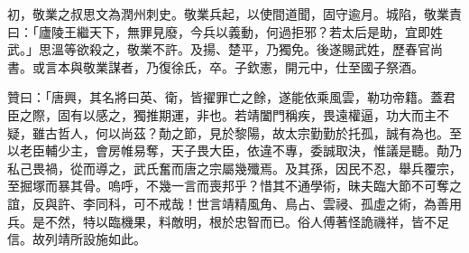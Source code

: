 \begin{pinyinscope}
 初，敬業之叔思文為潤州刺史。敬業兵起，以使間道聞，固守逾月。城陷，敬業責曰：「廬陵王繼天下，無罪見廢，今兵以義動，何過拒邪？若太后是助，宜即姓武。」思溫等欲殺之，敬業不許。及揚、楚平，乃獨免。後遂賜武姓，歷春官尚書。或言本與敬業謀者，乃復徐氏，卒。子欽憲，開元中，仕至國子祭酒。



 贊曰：「唐興，其名將曰英、衛，皆擢罪亡之餘，遂能依乘風雲，勒功帝籍。蓋君臣之際，固有以感之，獨推期運，非也。若靖闔門稱疾，畏遠權逼，功大而主不疑，雖古哲人，何以尚茲？勣之節，見於黎陽，故太宗勤勤於托孤，誠有為也。至以老臣輔少主，會房帷易奪，天子畏大臣，依違不專，委誠取決，惟議是聽。勣乃私己畏禍，從而導之，武氏奮而唐之宗屬幾殲焉。及其孫，因民不忍，舉兵覆宗，至掘塚而暴其骨。嗚呼，不幾一言而喪邦乎？惜其不通學術，昧夫臨大節不可奪之誼，反與許、李同科，可不戒哉！世言靖精風角、鳥占、雲祲、孤虛之術，為善用兵。是不然，特以臨機果，料敵明，根於忠智而已。俗人傅著怪詭禨祥，皆不足信。故列靖所設施如此。



\end{pinyinscope}